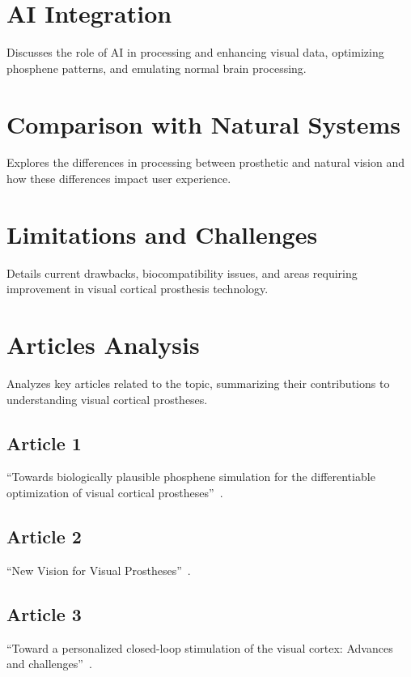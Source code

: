\documentclass[twocolumn,10pt]{article}
\begin{document}
\section{AI Integration}\label{sec:ai_integration}
Discusses the role of AI in processing and enhancing visual data, optimizing
phosphene patterns, and emulating normal brain processing.

\section{Comparison with Natural Systems}\label{sec:comparison}
Explores the differences in processing between prosthetic and natural vision and
how these differences impact user experience.

\section{Limitations and Challenges}\label{sec:limitations}
Details current drawbacks, biocompatibility issues, and areas requiring
improvement in visual cortical prosthesis technology.

\section{Articles Analysis}\label{sec:articles}
Analyzes key articles related to the topic, summarizing their contributions to
understanding visual cortical prostheses.

\subsection{Article 1}
``Towards biologically plausible phosphene simulation for the differentiable
optimization of visual cortical
prostheses''~\cite{vandergrintenBiologicallyPlausiblePhosphene2024}.

\subsection{Article 2}
``New Vision for Visual Prostheses''~\cite{farnumNewVisionVisual2020}.

\subsection{Article 3}
``Toward a personalized closed-loop stimulation of the visual cortex: Advances
and challenges''~\cite{graniPersonalizedClosedloopStimulation2022}.
\end{document}
